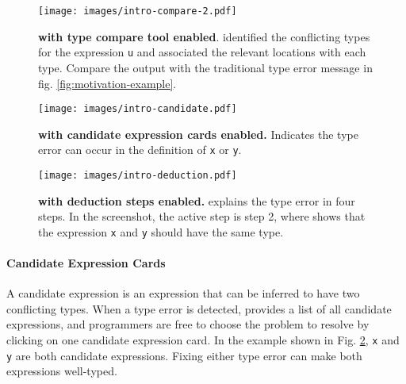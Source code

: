 \begin{figure}
    \centering
    \texttt{[image: images/intro-compare-2.pdf]}
    \caption{
        \textbf{\chameleon{} with type compare tool enabled}. \chameleon{} identified the conflicting types for the expression \texttt{u} and associated the relevant locations with each type. Compare the output with the traditional type error message in fig. \ref{fig:motivation-example}.
}
    \label{fig:compare}
\end{figure}

\begin{figure}
    \centering
    \texttt{[image: images/intro-candidate.pdf]}
    \caption{
        \textbf{\chameleon{} with candidate expression cards enabled.}
        Indicates the type error can occur in the definition of \texttt{x} or \texttt{y}.
    }
    \label{fig:expression}
\end{figure}


\begin{figure}
    \centering
    \texttt{[image: images/intro-deduction.pdf]}
    \caption{
        \textbf{\chameleon{} with deduction steps enabled.}
        \chameleon{} explains the type error in four steps. In the screenshot, the active step is step 2, where \chameleon{} shows that the expression \texttt{x} and \texttt{y} should have the same type. 
    }
    \label{fig:deduction}
\end{figure}



\paragraph{Candidate Expression Cards}  \label{sub:candidate-expression}


A candidate expression is an expression that can be inferred to have two conflicting types. 
When a type error is detected, \chameleon{} provides a list of all candidate expressions, and programmers are free to choose the problem to resolve by clicking on one candidate expression card. In the example shown in Fig. \ref{fig:expression}, \texttt{x} and \texttt{y} are both candidate expressions. Fixing either type error can make both expressions well-typed.


